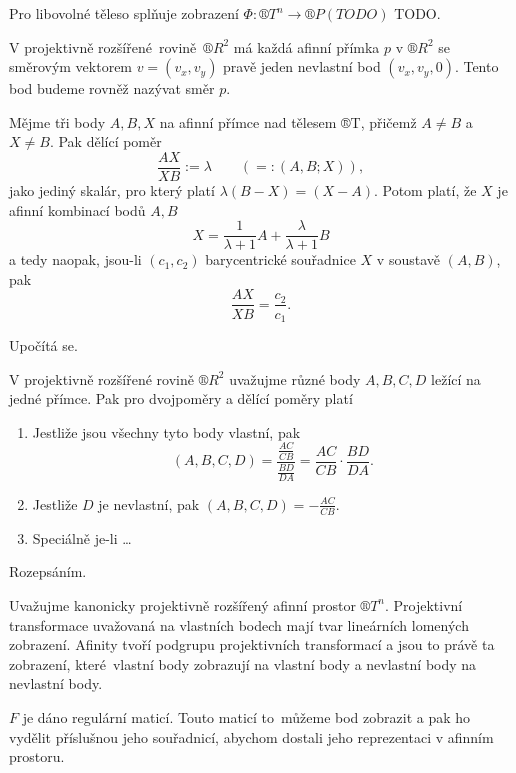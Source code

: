 \documentclass[12pt]{article}					%
\begin{document}
\begin{definice}
	Pro libovolné těleso splňuje zobrazení $\Phi: ®T^n \rightarrow ®P(TODO)$ TODO.
\end{definice}

\begin{veta}
	V projektivně rozšířené rovině $®R^2$ má každá afinní přímka $p$ v $®R^2$ se směrovým vektorem $v = (v_x, v_y)$ pravě jeden nevlastní bod $(v_x, v_y, 0)$. Tento bod budeme rovněž nazývat směr $p$.
\end{veta}


\begin{definice}
	Mějme tři body $A, B, X$ na afinní přímce nad tělesem ®T, přičemž $A ≠ B$ a $X ≠ B$. Pak dělící poměr
	$$ \frac{AX}{XB} := \lambda\qquad (=: (A, B; X)), $$
	jako jediný skalár, pro který platí $\lambda(B - X) = (X - A)$. Potom platí, že $X$ je afinní kombinací bodů $A, B$
	$$ X = \frac{1}{\lambda + 1}A + \frac{\lambda}{\lambda + 1}B $$
	a tedy naopak, jsou-li $(c_1, c_2)$ barycentrické souřadnice $X$ v soustavě $(A, B)$, pak
	$$ \frac{AX}{XB} = \frac{c_2}{c_1}. $$

	\begin{dukazin}
		Upočítá se.
	\end{dukazin}
\end{definice}

\begin{veta}
	V projektivně rozšířené rovině $®R^2$ uvažujme různé body $A, B, C, D$ ležící na jedné přímce. Pak pro dvojpoměry a dělící poměry platí

	\begin{enumerate}
		\item Jestliže jsou všechny tyto body vlastní, pak
			$$ (A, B, C, D) = \frac{\frac{AC}{CB}}{\frac{BD}{DA}} = \frac{AC}{CB}·\frac{BD}{DA}. $$
		\item Jestliže $D$ je nevlastní, pak $(A, B, C, D) = -\frac{AC}{CB}$.
		\item Speciálně je-li …
	\end{enumerate}

	\begin{dukazin}
		Rozepsáním.
	\end{dukazin}
\end{veta}

\begin{veta}
	Uvažujme kanonicky projektivně rozšířený afinní prostor $®T^n$. Projektivní transformace uvažovaná na vlastních bodech mají tvar lineárních lomených zobrazení. Afinity tvoří podgrupu projektivních transformací a jsou to právě ta zobrazení, které vlastní body zobrazují na vlastní body a nevlastní body na nevlastní body.

	\begin{dukazin}
		$F$ je dáno regulární maticí. Touto maticí to můžeme bod zobrazit a pak ho vydělit příslušnou jeho souřadnicí, abychom dostali jeho reprezentaci v afinním prostoru.
	\end{dukazin}
\end{veta}
\end{document}
